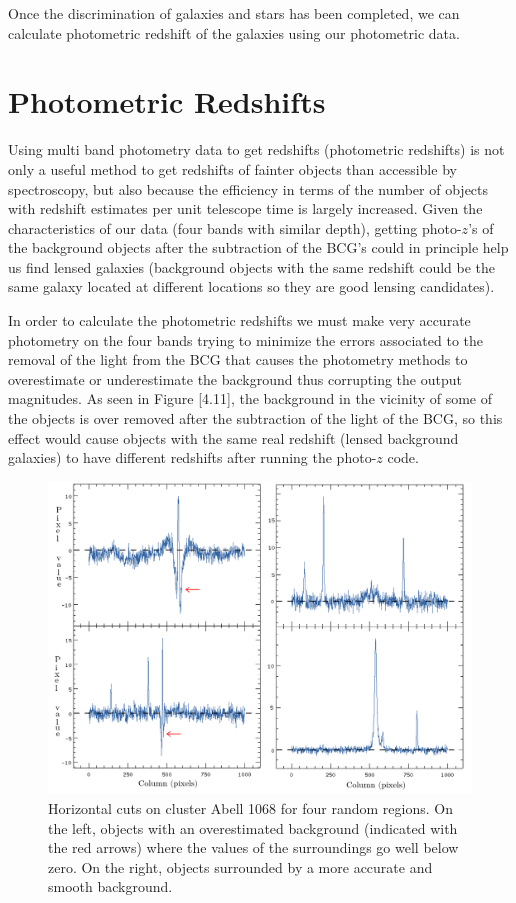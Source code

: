 Once the discrimination of galaxies and stars has been completed, we can calculate photometric redshift of the galaxies using our photometric data.

\section{Photometric Redshifts}

Using multi band photometry data to get redshifts (photometric redshifts) is not only a useful method to get redshifts of fainter objects than accessible by spectroscopy, but also because the efficiency in terms of the number of objects with redshift estimates per unit telescope time is largely increased. Given the characteristics of our data (four bands with similar depth), getting photo-$z$'s of the background objects after the subtraction of the BCG's could in principle help us find lensed galaxies (background objects with the same redshift could be the same galaxy located at different locations so they are good lensing candidates).

In order to calculate the photometric redshifts we must make very accurate photometry on the four bands trying to minimize the errors associated to the removal of the light from the BCG that causes the photometry methods to overestimate or underestimate the background thus corrupting the output magnitudes. As seen in Figure [4.11], the background in the vicinity of some of the objects is over removed after the subtraction of the light of the BCG, so this effect would cause objects with the same real redshift (lensed background galaxies) to have different redshifts after running the photo-$z$ code.

\begin{figure}[H]
\centering
\includegraphics[width=15cm]{images/horizontal_cuts.png}
\caption[Horizontal cuts to show overestimated background on Abell 1068]{Horizontal cuts on cluster Abell 1068 for four random regions. On the left, objects with an overestimated background (indicated with the red arrows) where the values of the surroundings go well below zero. On the right, objects surrounded by a more accurate and smooth background.}
\end{figure}

